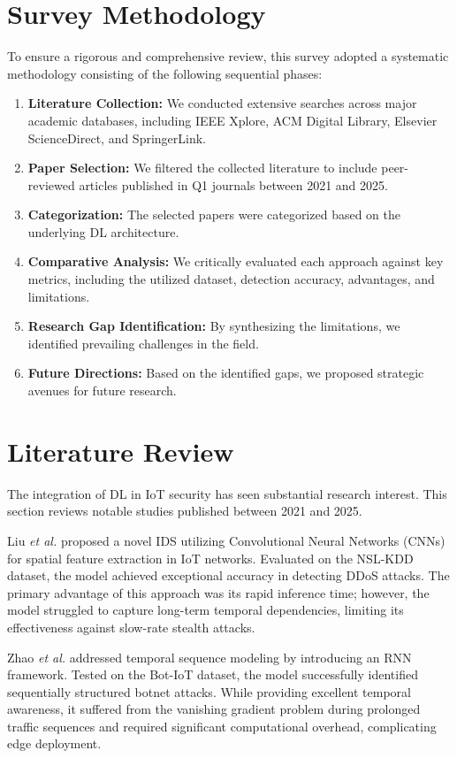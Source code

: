 \documentclass[conference]{IEEEtran}
\begin{document}
\section{Survey Methodology}
To ensure a rigorous and comprehensive review, this survey adopted a systematic methodology consisting of the following sequential phases:
\begin{enumerate}
    \item \textbf{Literature Collection:} We conducted extensive searches across major academic databases, including IEEE Xplore, ACM Digital Library, Elsevier ScienceDirect, and SpringerLink.
    \item \textbf{Paper Selection:} We filtered the collected literature to include peer-reviewed articles published in Q1 journals between 2021 and 2025.
    \item \textbf{Categorization:} The selected papers were categorized based on the underlying DL architecture.
    \item \textbf{Comparative Analysis:} We critically evaluated each approach against key metrics, including the utilized dataset, detection accuracy, advantages, and limitations.
    \item \textbf{Research Gap Identification:} By synthesizing the limitations, we identified prevailing challenges in the field.
    \item \textbf{Future Directions:} Based on the identified gaps, we proposed strategic avenues for future research.
\end{enumerate}

\section{Literature Review}
The integration of DL in IoT security has seen substantial research interest. This section reviews notable studies published between 2021 and 2025.

Liu \textit{et al.} \cite{liu2021novel} proposed a novel IDS utilizing Convolutional Neural Networks (CNNs) for spatial feature extraction in IoT networks. Evaluated on the NSL-KDD dataset, the model achieved exceptional accuracy in detecting DDoS attacks. The primary advantage of this approach was its rapid inference time; however, the model struggled to capture long-term temporal dependencies, limiting its effectiveness against slow-rate stealth attacks.

Zhao \textit{et al.} \cite{zhao2021} addressed temporal sequence modeling by introducing an RNN framework. Tested on the Bot-IoT dataset, the model successfully identified sequentially structured botnet attacks. While providing excellent temporal awareness, it suffered from the vanishing gradient problem during prolonged traffic sequences and required significant computational overhead, complicating edge deployment.
\end{document}
